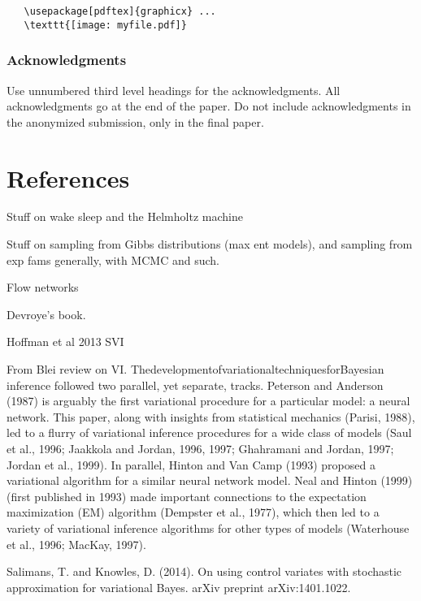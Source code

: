 \documentclass{article}
\begin{document}
\begin{verbatim}
   \usepackage[pdftex]{graphicx} ...
   \texttt{[image: myfile.pdf]}
\end{verbatim}




\clearpage

\subsubsection*{Acknowledgments}

Use unnumbered third level headings for the acknowledgments. All
acknowledgments go at the end of the paper. Do not include
acknowledgments in the anonymized submission, only in the final paper.

\section*{References}




Stuff on wake sleep and the Helmholtz machine

Stuff on sampling from Gibbs distributions (max ent models), and sampling from exp fams generally, with MCMC and such.

Flow networks

Devroye's book.

Hoffman et al 2013 SVI 


From Blei review on VI.
ThedevelopmentofvariationaltechniquesforBayesian inference followed two parallel, yet separate, tracks. Peterson and Anderson (1987) is arguably the first variational procedure for a particular model: a neural network. This paper, along with insights from statistical mechanics (Parisi, 1988), led to a flurry of variational inference procedures for a wide class of models (Saul et al., 1996; Jaakkola and Jordan, 1996, 1997; Ghahramani and Jordan, 1997; Jordan et al., 1999). In parallel, Hinton and Van Camp (1993) proposed a variational algorithm for a similar neural network model. Neal and Hinton (1999) (first published in 1993) made important connections to the expectation maximization (EM) algorithm (Dempster et al., 1977), which then led to a variety of variational inference algorithms for other types of models (Waterhouse et al., 1996; MacKay, 1997).

Salimans, T. and Knowles, D. (2014). On using control variates with stochastic approximation for variational Bayes. arXiv preprint arXiv:1401.1022.
\end{document}
